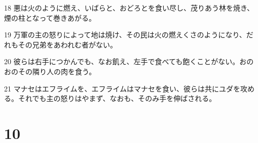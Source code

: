\par 18 悪は火のように燃え、いばらと、おどろとを食い尽し、茂りあう林を焼き、煙の柱となって巻きあがる。
\par 19 万軍の主の怒りによって地は焼け、その民は火の燃えくさのようになり、だれもその兄弟をあわれむ者がない。
\par 20 彼らは右手につかんでも、なお飢え、左手で食べても飽くことがない。おのおのその隣り人の肉を食う。
\par 21 マナセはエフライムを、エフライムはマナセを食い、彼らは共にユダを攻める。それでも主の怒りはやまず、なおも、そのみ手を伸ばされる。

\chapter{10}

